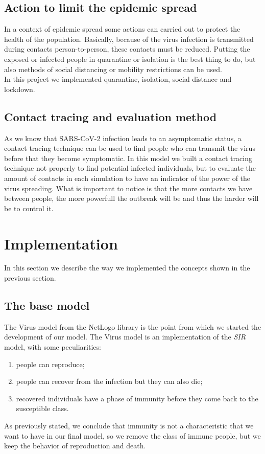 \documentclass[12pt]{llncs}
\begin{document}
\subsection{Action to limit the epidemic spread}
In a context of epidemic spread some actions can carried out to protect the health of the population. Basically, because of the virus infection is transmitted during contacts person-to-person, these contacts must be reduced. Putting the exposed or infected people in quarantine or isolation is the best thing to do, but also methods of social distancing or mobility restrictions can be used. \\
In this project we implemented quarantine, isolation, social distance and lockdown.

\subsection{Contact tracing and evaluation method}
As we know that SARS-CoV-2 infection leads to an asymptomatic status, a contact tracing technique can be used to find people who can transmit the virus before that they become symptomatic. In this model we built a contact tracing technique not properly to find potential infected individuals, but to evaluate the amount of contacts in each simulation to have an indicator of the power of the virus spreading. What is important to notice is that the more contacts we have between people, the more powerfull the outbreak will be and thus the harder will be to control it.

\section{Implementation}
In this section we describe the way we implemented the concepts shown in the previous section.

\subsection{The base model}
The Virus model from the NetLogo library \cite{netlogo-virus} is the point from which we started the development of our model. The Virus model is an implementation of the \textit{SIR} model, with some peculiarities:
\begin{enumerate}
\item people can reproduce;
\item people can recover from the infection but they can also die;
\item recovered individuals have a phase of immunity before they come back to the susceptible class.
\end{enumerate}
As previously stated, we conclude that immunity is not a characteristic that we want to have in our final model, so we remove the class of immune people, but we keep the behavior of reproduction and death.
\end{document}
